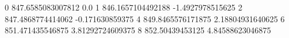 0 847.6585083007812 0.0
1 846.1657104492188 -1.4927978515625
2 847.4868774414062 -0.171630859375
4 849.8465576171875 2.18804931640625
6 851.471435546875 3.81292724609375
8 852.50439453125 4.84588623046875
